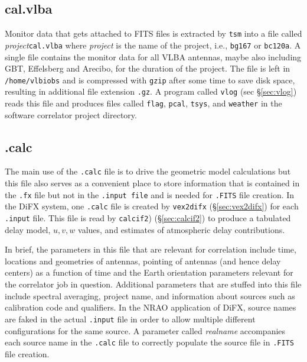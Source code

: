 
\subsection{cal.vlba} \label{sec:cal}

Monitor data that gets attached to FITS files is extracted by {\tt tsm} into a file called {\em project}{\tt cal.vlba} where {\em project} is the name of the project, i.e., {\tt bg167} or {\tt bc120a}.
A single file contains the monitor data for all VLBA antennas, maybe also including GBT, Effelsberg and Arecibo, for the duration of the project.
The file is left in {\tt /home/vlbiobs} and is compressed with {\tt gzip} after some time to save disk space, resulting in additional file extension {\tt .gz}.
A program called {\tt vlog} (sec \S\ref{sec:vlog}) reads this file and produces files called {\tt flag}, {\tt pcal}, {\tt tsys}, and {\tt weather} in the software correlator project directory.








\subsection{.calc} \label{sec:calc}

The main use of the {\tt .calc} file is to drive the geometric model calculations but this file also serves as a convenient place to store information that is contained in the {\tt .fx} file but not in the {\tt .input file} and is needed for {\tt .FITS} file creation.
In the DiFX system, one {\tt .calc} file is created by {\tt vex2difx} (\S\ref{sec:vex2difx}) for each {\tt .input} file.
This file is read by {\tt calcif2}) (\S\ref{sec:calcif2}) to produce a tabulated delay model, $u, v, w$ values, and estimates of atmospheric delay contributions.

In brief, the parameters in this file that are relevant for correlation include time, locations and geometries of antennas, pointing of antennas (and hence delay centers) as a function of time and the Earth orientation parameters relevant for the correlator job in question.
Additional parameters that are stuffed into this file include spectral averaging, project name, and information about sources such as calibration code and qualifiers.
In the NRAO application of DiFX, source names are faked in the actual {\tt .input} file in order to allow multiple different configurations for the same source.
A parameter called {\em realname} accompanies each source name in the {\tt .calc} file to correctly populate the source file in {\tt .FITS} file creation.

